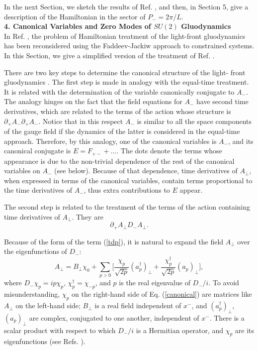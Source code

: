 \documentclass[a4paper,12pt]{article}
\begin{document}
In the next Section, we sketch the results of Ref. \cite{KMPV}, and then, 
in Section 5, 
give a description of the Hamiltonian in the sector of $P_- =2\pi/L$.\\

{\bf 4. Canonical Variables and Zero Modes of $SU(2)$ Gluodynamics }\\

In Ref. \cite{KMPV}, the problem of Hamiltonian treatment of the 
light-front gluodynamics has been reconsidered using 
the  Faddeev-Jackiw 
approach \cite{Jackiw} to constrained systems. In this Section, we 
give a simplified version of the treatment of Ref. \cite{KMPV}.

There are two key steps to determine the canonical 
structure of the light-
front gluodynamics \cite{KMPV}. The first step is made in analogy 
with the equal-time treatment. It is related with the determination 
of the variable canonically 
 conjugate to $A_-$. The analogy hinges on the fact that 
the field equations for 
$A_-$ have second time derivatives, which are related to 
the terms of the action 
whose structure is $\partial_+A_-\partial_+A_-$. 
Notice that in this respect $A_-$ 
is similar to all the space components of the gauge field 
if the dynamics of the 
latter is considered in the equal-time approach. Therefore, 
by this analogy, one of 
the canonical variables is $A_-$, and its canonical conjugate is 
$E=F_{+-} + \ldots$. 
The dots denote the terms whose appearance is due to 
the non-trivial dependence of the rest of the canonical 
variables on $A_-$ (see below). 
Because of that dependence, time derivatives of $A_\perp$, 
when expressed in terms of the 
canonical variables, contain terms proportional to 
the time derivatives of $A_-$, 
thus extra contributions to $E$ appear.

The second step is related to the treatment of the terms 
of the action containing 
time derivatives of $A_\perp$. They are
\begin{equation}
\label{tdp}
\partial_+A_\perp D_-A_\perp.
\end{equation}

Because of the form of the term (\ref{tdp}), 
it is natural to expand the field 
$A_\perp$ over the eigenfunctions of $D_-$:
\begin{equation}
\label{canonical}
A_\perp = B_\perp\chi_0 + 
\sum_{p>0}\bigg[\frac{\chi_p}{\sqrt{2p}}(a_p^\dagger)_\perp 
+\frac{\chi_p^\dagger}{\sqrt{2p}}(a_p)_\perp\bigg],
\end{equation}
where $D_-\chi_p = ip\chi_p$, $\chi^\dagger_p=\chi_{-p}$, 
and $p$ is the real eigenvalue of $D_-/i$. 
To avoid misunderstanding, $\chi_p$ 
on the right-hand side
of Eq. (\ref{canonical}) are matrices like $A_\perp$ on the 
left-hand side; $B_\perp$ 
is a real field independent of $x^-$, and 
$(a_p^\dagger)_\perp$, $(a_p)_\perp$ are complex, 
conjugated to one another, independent of $x^-$. 
There is a scalar product with 
respect to which $D_-/i$ is a Hermitian operator, 
and $\chi_p$ are its 
eigenfunctions (see Refs. \cite{KMPV,Naus}).
\end{document}
